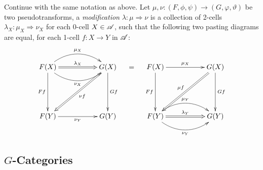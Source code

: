 \documentclass{article}
\begin{document}
\hfil

\begin{defn}[Modification]\label{defn_modification}
    Continue with the same notation as above. Let $\mu,\nu:(F,\phi,\psi)\rightarrow (G,\varphi,\vartheta)$ be two pseudotransforms, a \emph{modification} $\lambda:\mu\Rightarrow\nu$ is a collection of 2-cells $\lambda_X:\mu_X\Rightarrow\nu_X$ for each 0-cell $X\in\mathscr{A}$, such that the following two pasting diagrams are equal, for each 1-cell $f:X\rightarrow Y$ in $\mathscr{A}$:
    \begin{align*}
        \xymatrix{
            F(X) \ar[dd]_-{Ff} \ar@(ur,ul)[rr]^-{\mu_X} \ar@(dr,dl)[rr]_-{\nu_X} \ar@{=>}[rr]^-{\lambda_X} && G(X) \ar@{=>}[ddll]^-{\nu f} \ar[dd]^-{Gf}\\
            \\
            F(Y) \ar[rr]_-{\nu_Y} && G(Y)
        }\quad = \quad \xymatrix{
            F(X) \ar[dd]_-{Ff} \ar[rr]^-{\mu_X} && G(X) \ar[dd]^-{Gf} \ar@{=>}[ddll]_-{\mu f}\\
            \\
            F(Y) \ar@(ur,ul)[rr]^-{\mu_Y} \ar@{=>}[rr]^-{\lambda_Y} \ar@(dr,dl)[rr]_-{\nu_Y} && G(Y)
        }
    \end{align*}

\end{defn}

\hfil




\subsection{$G$-Categories}\label{sub_G_cat}
\end{document}
